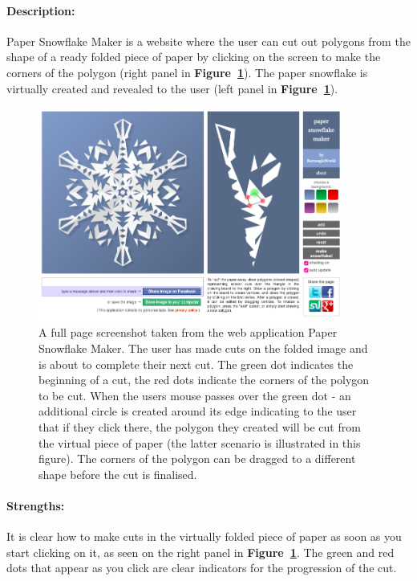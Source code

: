 \documentclass[11pt]{article}
\begin{document}
                \paragraph{Description:}
                Paper Snowflake Maker is a website where the user can cut out polygons from the shape of a ready folded piece of paper by clicking on the screen to make the corners of the polygon (right panel in \textbf{Figure~\ref{fig:paperSnowflakeMaker}}). The paper snowflake is virtually created and revealed to the user (left panel in \textbf{Figure~\ref{fig:paperSnowflakeMaker}}).
                    \begin{figure}[ht]\centering\includegraphics[width=0.9\textwidth]{Images/paperSnowflakeMaker}
                        \caption{
                        \label{fig:paperSnowflakeMaker}
                        A full page screenshot taken from the web application Paper Snowflake Maker. The user has made cuts on the folded image and is about to complete their next cut. The green dot indicates the beginning of a cut, the red dots indicate the corners of the polygon to be cut. When the users mouse passes over the green dot - an additional circle is created around its edge indicating to the user that if they click there, the polygon they created will be cut from the virtual piece of paper (the latter scenario is illustrated in this figure). The corners of the polygon can be dragged to a different shape before the cut is finalised.}
                    \end{figure}
                    
                \paragraph{Strengths:}
                It is clear how to make cuts in the virtually folded piece of paper as soon as you start clicking on it, as seen on the right panel in \textbf{Figure~\ref{fig:paperSnowflakeMaker}}. The green and red dots that appear as you click are clear indicators for the progression of the cut.
                
\end{document}
